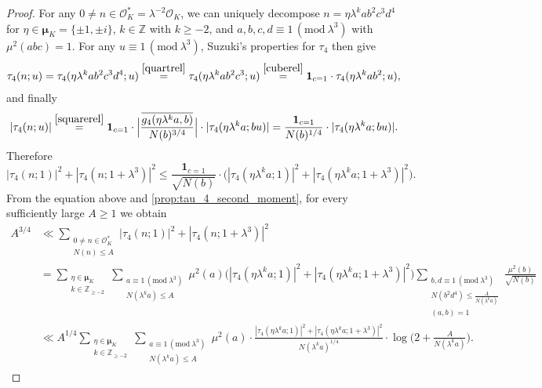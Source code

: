 \documentclass[12pt,reqno]{amsart}
\numberwithin{equation}{section}
\renewcommand{\pmod}[1]{\, (\mathrm{mod}\ #1)}
\newcommand{\Z}{\mathbb{Z}}
\begin{document}
\begin{proof}
    For any $0 \neq n \in \mathcal{O}_K^* =  \lambda^{-2}\mathcal{O}_K$, we can uniquely decompose $n = \eta \lambda^k ab^2c^3d^4$ for $\eta \in \boldsymbol{\mu}_K =\{\pm 1, \pm i \}$, $k \in \Z$ with $k \geq -2$, and $a, b, c, d\equiv 1 \pmod{\lambda^3}$ with $\mu^2(abc)=1$. For any $u \equiv 1 \pmod{\lambda^3}$, Suzuki's properties for $\tau_4$ then give
    \begin{align*}
        \tau_4(n; u) = \tau_4(\eta \lambda^k a b^2 c^3 d^4; u) \overset{\eqref{quartrel}}{=} \tau_4(\eta \lambda^k a b^2 c^3; u) \overset{\eqref{cuberel}}{=} \mathbf{1}_{c=1} \cdot \tau_4(\eta \lambda^k a b^2; u),
    \end{align*}
    and finally
    \begin{equation*}
        |\tau_4(n;u)| \overset{\eqref{squarerel}}{=} \mathbf{1}_{c=1} \cdot \Big|\frac{\overline{g_4(\eta \lambda^k a,b)}}{N(b)^{3/4}}\Big| \cdot|\tau_4(\eta \lambda^k a; bu)| = \frac{\mathbf{1}_{c=1}}{N(b)^{1/4}} \cdot |\tau_4(\eta \lambda^k a; bu)|.
    \end{equation*}
    Therefore 
    \begin{equation*}
        |\tau_4(n;1)|^2 + |\tau_4(n;1+\lambda^3)|^2 \leq \frac{\mathbf{1}_{c=1}}{\sqrt{N(b)}} \cdot \big(|\tau_4(\eta \lambda^k a; 1)|^2 + |\tau_4(\eta \lambda^k a; 1+\lambda^3)|^2\big).
    \end{equation*}
    From the equation above and \cref{prop:tau_4_second_moment}, for every sufficiently large $A\geq 1$ we obtain
    \begin{align} \label{sqintermed}
        A^{3/4} &\ll \sum_{\substack{0 \neq n \in \mathcal{O}^*_K \\ N(n) \leq A}} |\tau_4(n;1)|^2 + |\tau_4(n;1+\lambda^3)|^2 \nonumber \\
        &= \sum_{\substack{\eta \in \boldsymbol{\mu}_K \\ k \in \Z_{\geq -2}}} \sum_{\substack{a \equiv 1 \pmod{\lambda^3} \\ N(\lambda^k a) \leq A}} \mu^2(a) \big(|\tau_4(\eta \lambda^k a; 1)|^2 + |\tau_4(\eta \lambda^k a; 1+\lambda^3)|^2\big) \sum_{\substack{b, d \equiv 1 \pmod{\lambda^3} \\ N(b^2d^4) \leq \frac{A}{N(\lambda^ka)} \\ (a, b)=1}} \frac{\mu^2(b)}{\sqrt{N(b)}} \nonumber \\
        & \ll A^{1/4} \sum_{\substack{\eta \in \boldsymbol{\mu}_K \\ k \in \Z_{\geq -2}}} \sum_{\substack{a \equiv 1 \pmod{\lambda^3} \\ N(\lambda^k a) \leq A}} \mu^2(a) \cdot \frac{|\tau_4(\eta \lambda^k a; 1)|^2 + |\tau_4(\eta \lambda^k a; 1+\lambda^3)|^2}{N(\lambda^k a)^{1/4}} \cdot \log\Big(2 + \frac{A}{N(\lambda^k a)}\Big). 
    \end{align}
    

\end{proof}
\end{document}
